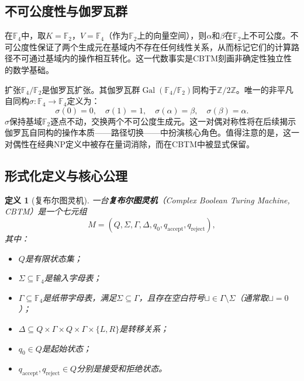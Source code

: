 \documentclass{ctexart}
\newtheorem{definition}[theorem]{定义}
\begin{document}
	\subsection{不可公度性与伽罗瓦群}
	
	在$\mathbb{F}_4$中，取$K = \mathbb{F}_2$，$V = \mathbb{F}_4$（作为$\mathbb{F}_2$上的向量空间），则$\alpha$和$\beta$在$\mathbb{F}_2$上不可公度。不可公度性保证了两个生成元在基域内不存在任何线性关系，从而标记它们的计算路径不可通过基域内的操作相互转化。这一代数事实是CBTM刻画非确定性独立性的数学基础。
	
	扩张$\mathbb{F}_4/\mathbb{F}_2$是伽罗瓦扩张。其伽罗瓦群$\operatorname{Gal}(\mathbb{F}_4/\mathbb{F}_2)$同构于$\mathbb{Z}/2\mathbb{Z}$。唯一的非平凡自同构$\sigma: \mathbb{F}_4 \to \mathbb{F}_4$定义为：
	\begin{equation}\label{eq:sigma}
		\sigma(0) = 0, \quad \sigma(1) = 1, \quad \sigma(\alpha) = \beta, \quad \sigma(\beta) = \alpha.
	\end{equation}
	$\sigma$保持基域$\mathbb{F}_2$逐点不动，交换两个不可公度生成元。这一对偶对称性将在后续揭示伽罗瓦自同构的操作本质——路径切换——中扮演核心角色。值得注意的是，这一对偶性在经典NP定义中被存在量词消除，而在CBTM中被显式保留。
	
	\subsection{形式化定义与核心公理}
	
	\begin{definition}[复布尔图灵机]\label{def:cbtm}
		一台\textbf{复布尔图灵机}（Complex Boolean Turing Machine, CBTM）是一个七元组
		\[
		M = (Q, \Sigma, \Gamma, \Delta, q_0, q_{\text{accept}}, q_{\text{reject}}),
		\]
		其中：
		\begin{itemize}
			\item $Q$是有限状态集；
			\item $\Sigma \subseteq \mathbb{F}_4$是输入字母表；
			\item $\Gamma \subseteq \mathbb{F}_4$是纸带字母表，满足$\Sigma \subseteq \Gamma$，且存在空白符号$\sqcup \in \Gamma \setminus \Sigma$（通常取$\sqcup = 0$）；
			\item $\Delta \subseteq Q \times \Gamma \times Q \times \Gamma \times \{L,R\}$是转移关系；
			\item $q_0 \in Q$是起始状态；
			\item $q_{\text{accept}}, q_{\text{reject}} \in Q$分别是接受和拒绝状态。
		\end{itemize}
	\end{definition}
	
\end{document}
